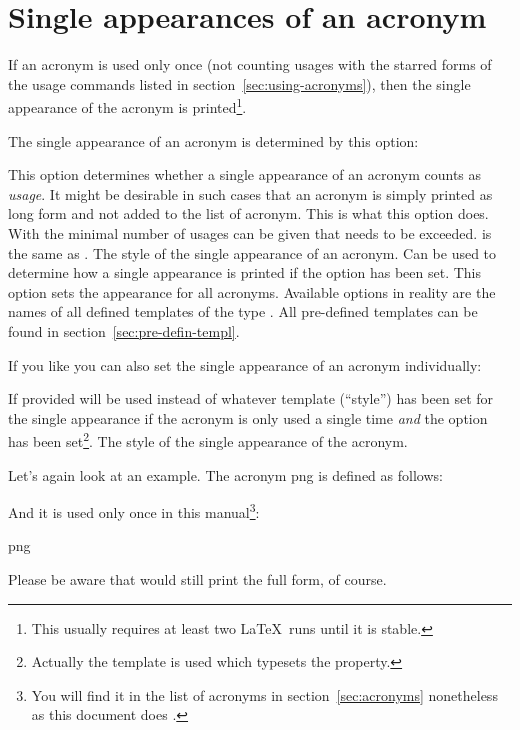 \documentclass{acro-manual}
\begin{document}
\section{Single appearances of an acronym}\label{sec:single-appe-an}
If an acronym is used only once (not counting usages with the starred forms of
the usage commands listed in section~\vref{sec:using-acronyms}), then the
single appearance of the acronym is printed\footnote{This usually requires at
  least two \LaTeX\ runs until it is stable.}.

The single appearance of an acronym is determined by this option:
\begin{options}
    This option determines whether a single appearance of an acronym counts as
    \emph{usage}. It might be desirable in such cases that an acronym is
    simply printed as long form and not added to the list of acronym.  This is
    what this option does.  With  the minimal number of usages
    can be given that needs to be exceeded.   is the same as
    .
    The style of the single appearance of an acronym.  Can be used to
    determine how a single appearance is printed if the option 
    has been set. This option sets the appearance for all acronyms.
    Available options in reality are the names of all defined templates of the
    type . All pre-defined templates can be found in
    section~\vref{sec:pre-defin-templ}.
\end{options}

If you like you can also set the single appearance of an acronym individually:
\begin{properties}
  \Initial
    If provided  will be used instead of whatever template
    (\enquote{style}) has been set for the single appearance if the acronym is
    only used a single time \emph{and} the option  has been
    set\footnote{Actually the template  is used which
      typesets the  property.}.
  \Initial
    The style of the single appearance of the acronym.
\end{properties}
Let's again look at an example. The acronym \acs*{png} is defined as follows:
\begin{sourcecode}
\end{sourcecode}
And it is used only once in this manual\footnote{You will find it in the list
  of acronyms in section~\ref{sec:acronyms} nonetheless as this document does
  .}:
\begin{example}
  \ac{png}
\end{example}  
Please be aware that  would still print the full form, of course.
\end{document}
